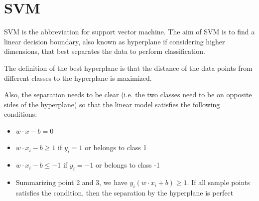 \documentclass[12pt]{article}
\begin{document}
\section{SVM}
SVM is the abbreviation for support vector machine. The aim of SVM is to find a linear decision boundary, also known as hyperplane if considering higher dimensions, that best separates the data to perform classification.

The definition of the best hyperplane is that the distance of the data points from different classes to the hyperplane is maximized.

Also, the separation needs to be clear (i.e. the two classes need to be on opposite sides of the hyperplane) so that the linear model satisfies the following conditions:
\begin{itemize}
	\item $w\cdot x - b = 0$
	\item $w\cdot x_i - b \geq 1$ if $y_i = 1$ or belongs to class 1
	\item $w\cdot x_i - b \leq -1$ if $y_i = -1$ or belongs to class -1
	\item Summarizing point 2 and 3, we have $y_i(w\cdot x_i + b) \geq 1$. If all sample points satisfies the condition, then the separation by the hyperplane is perfect
\end{itemize}
\end{document}
